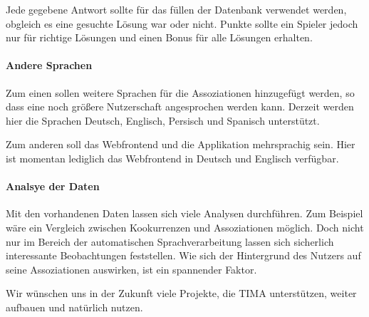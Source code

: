 Jede gegebene Antwort sollte für das füllen der Datenbank verwendet werden, obgleich
es eine gesuchte Lösung war oder nicht. Punkte sollte ein Spieler jedoch nur
für richtige Lösungen und einen Bonus für alle Lösungen erhalten.

\paragraph{Andere Sprachen}
Zum einen sollen weitere Sprachen für die Assoziationen hinzugefügt werden, so dass eine noch größere Nutzerschaft angesprochen werden kann. Derzeit werden hier die Sprachen Deutsch, Englisch, Persisch und Spanisch unterstützt.

Zum anderen soll das Webfrontend und die Applikation mehrsprachig sein. Hier ist momentan lediglich das Webfrontend in Deutsch und Englisch verfügbar.

\paragraph{Analsye der Daten}
Mit den vorhandenen Daten lassen sich viele Analysen durchführen. Zum Beispiel wäre ein Vergleich zwischen Kookurrenzen und Assoziationen möglich. Doch nicht nur im Bereich der automatischen Sprachverarbeitung lassen sich sicherlich interessante Beobachtungen feststellen. Wie sich der Hintergrund des Nutzers auf seine Assoziationen auswirken, ist ein spannender Faktor.

Wir wünschen uns in der Zukunft viele Projekte, die TIMA unterstützen, weiter aufbauen und natürlich nutzen.
